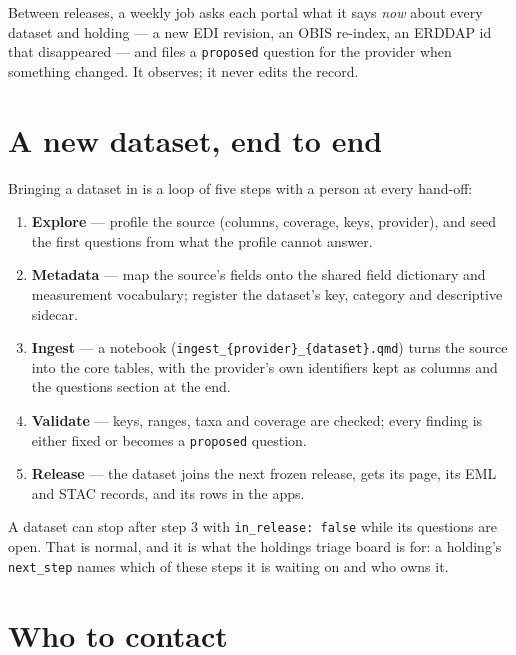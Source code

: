 \documentclass[
  letterpaper,
  DIV=11,
  numbers=noendperiod]{scrreprt}
\providecommand{\tightlist}{%
  \setlength{\itemsep}{0pt}\setlength{\parskip}{0pt}}
\begin{document}
Between releases, a weekly job asks each portal what it says \emph{now}
about every dataset and holding --- a new EDI revision, an OBIS
re-index, an ERDDAP id that disappeared --- and files a
\texttt{proposed} question for the provider when something changed. It
observes; it never edits the record.

\section{A new dataset, end to end}\label{a-new-dataset-end-to-end}

Bringing a dataset in is a loop of five steps with a person at every
hand-off:

\begin{enumerate}
\def\labelenumi{\arabic{enumi}.}
\tightlist
\item
  \textbf{Explore} --- profile the source (columns, coverage, keys,
  provider), and seed the first questions from what the profile cannot
  answer.
\item
  \textbf{Metadata} --- map the source's fields onto the shared field
  dictionary and measurement vocabulary; register the dataset's key,
  category and descriptive sidecar.
\item
  \textbf{Ingest} --- a notebook
  (\texttt{ingest\_\{provider\}\_\{dataset\}.qmd}) turns the source into
  the core tables, with the provider's own identifiers kept as columns
  and the questions section at the end.
\item
  \textbf{Validate} --- keys, ranges, taxa and coverage are checked;
  every finding is either fixed or becomes a \texttt{proposed} question.
\item
  \textbf{Release} --- the dataset joins the next frozen release, gets
  its page, its EML and STAC records, and its rows in the apps.
\end{enumerate}

A dataset can stop after step 3 with \texttt{in\_release:\ false} while
its questions are open. That is normal, and it is what the holdings
triage board is for: a holding's \texttt{next\_step} names which of
these steps it is waiting on and who owns it.

\section{Who to contact}\label{who-to-contact}
\end{document}

